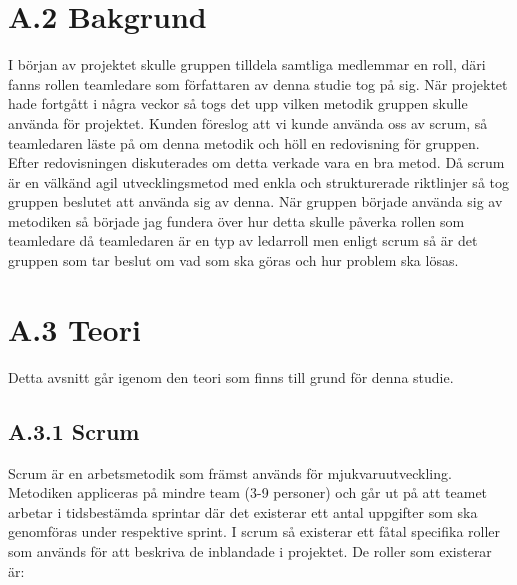 \section{A.2 Bakgrund}
I början av projektet skulle gruppen tilldela samtliga medlemmar en roll, däri fanns rollen teamledare som författaren av denna studie tog på sig. När projektet hade fortgått i några veckor så togs det upp vilken metodik gruppen skulle använda för projektet. Kunden föreslog att vi kunde använda oss av scrum, så teamledaren läste på om denna metodik och höll en redovisning för gruppen. Efter redovisningen diskuterades om detta verkade vara en bra metod. Då scrum är en välkänd agil utvecklingsmetod med enkla och strukturerade riktlinjer så tog gruppen beslutet att använda sig av denna. När gruppen började använda sig av metodiken så började jag fundera över hur detta skulle påverka rollen som teamledare då teamledaren är en typ av ledarroll men enligt scrum så är det gruppen som tar beslut om vad som ska göras och hur problem ska lösas.

\section{A.3 Teori}
Detta avsnitt går igenom den teori som finns till grund för denna studie.

\subsection{A.3.1 Scrum} \label{adam_scrum}
Scrum är en arbetsmetodik som främst används för mjukvaruutveckling. Metodiken appliceras på mindre team (3-9 personer) och går ut på att teamet arbetar i tidsbestämda sprintar där det existerar ett antal uppgifter som ska genomföras under respektive sprint.
I scrum så existerar ett fåtal specifika roller som används för att beskriva de inblandade i projektet. De roller som existerar är:

